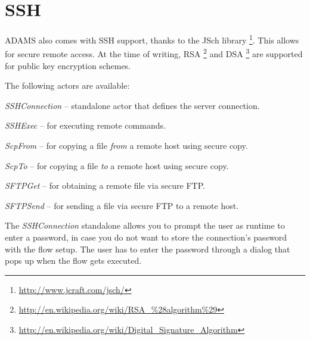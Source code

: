 \documentclass[a4paper]{book}
\begin{document}
\chapter{SSH}
ADAMS also comes with SSH support, thanks to the JSch library
\footnote{\url{http://www.jcraft.com/jsch/}{}}. This allows for secure remote
access. At the time of writing, RSA
\footnote{\url{http://en.wikipedia.org/wiki/RSA_\%28algorithm\%29}{}} and DSA
\footnote{\url{http://en.wikipedia.org/wiki/Digital_Signature_Algorithm}{}} are
supported for public key encryption schemes.

The following actors are available:
\begin{tight_itemize}
	\item \textit{SSHConnection} -- standalone actor that defines the server
	connection.
	\item \textit{SSHExec} -- for executing remote commands.
	\item \textit{ScpFrom} -- for copying a file \textit{from} a remote host using
	secure copy.
	\item \textit{ScpTo} -- for copying a file \textit{to} a remote host using
	secure copy.
	\item \textit{SFTPGet} -- for obtaining a remote file via secure FTP.
	\item \textit{SFTPSend} -- for sending a file via secure FTP to a remote host.
\end{tight_itemize}
The \textit{SSHConnection} standalone allows you to prompt the user as runtime
to enter a password, in case you do not want to store the connection's password
with the flow setup. The user has to enter the password through a dialog that
pops up when the flow gets executed.
\end{document}

